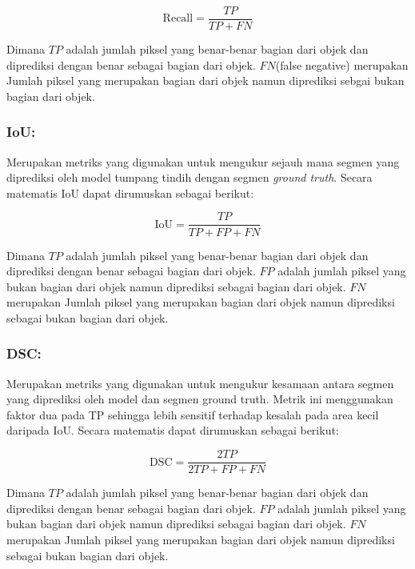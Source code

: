 \begin{equation}
	\text{Recall} = \frac{TP}{TP + FN}
\end{equation}

\noindent Dimana \(TP\) adalah jumlah piksel yang benar-benar bagian dari objek dan diprediksi dengan benar sebagai bagian dari objek. \(FN\)(false negative) merupakan Jumlah piksel yang merupakan bagian dari objek namun diprediksi sebgai bukan bagian dari objek.

\subsubsection{IoU:}
\noindent Merupakan metriks yang digunakan untuk mengukur sejauh mana segmen yang diprediksi oleh model tumpang tindih dengan segmen \textit{ground truth}\cite{jiang_iu-net_2023}. Secara matematis IoU dapat dirumuskan sebagai berikut:

\begin{equation}
	\text{IoU} = \frac{TP}{TP + FP + FN}
\end{equation}

\noindent Dimana \(TP\) adalah jumlah piksel yang benar-benar bagian dari objek dan diprediksi dengan benar sebagai bagian dari objek. \(FP\) adalah jumlah piksel yang bukan bagian dari objek namun diprediksi sebagai bagian dari objek. \(FN\) merupakan Jumlah piksel yang merupakan bagian dari objek namun diprediksi sebagai bukan bagian dari objek. 

\subsubsection{DSC:}

\noindent Merupakan metriks yang digunakan untuk mengukur kesamaan antara segmen yang diprediksi oleh model dan segmen ground truth\cite{jiang_iu-net_2023}. Metrik ini menggunakan faktor dua pada TP sehingga lebih sensitif terhadap kesalah pada area kecil daripada IoU. Secara matematis dapat dirumuskan sebagai berikut:

\begin{equation}
	\text{DSC} =  \frac{2TP}{2TP + FP + FN}
\end{equation}

\noindent Dimana \(TP\) adalah jumlah piksel yang benar-benar bagian dari objek dan diprediksi dengan benar sebagai bagian dari objek. \(FP\) adalah jumlah piksel yang bukan bagian dari objek namun diprediksi sebagai bagian dari objek. \(FN\) merupakan Jumlah piksel yang merupakan bagian dari objek namun diprediksi sebagai bukan bagian dari objek. 


